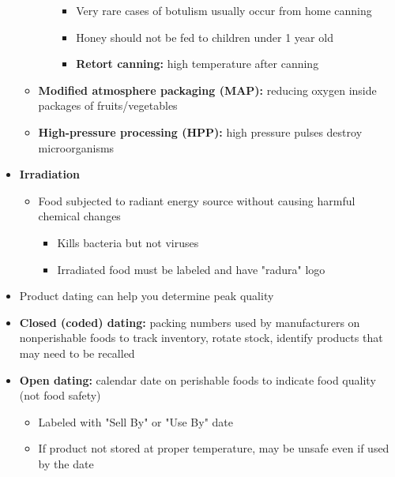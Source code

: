 \documentclass[12pt]{article}
\begin{document}
\begin{itemize}
\begin{itemize}
\begin{itemize}
\begin{itemize}
                                        \item Very rare cases of botulism usually occur from home canning
                                        \item Honey should not be fed to children under 1 year old
                                        \item \textbf{Retort canning:} high temperature after canning
                                    \end{itemize}
                            \end{itemize}
                        \item \textbf{Modified atmosphere packaging (MAP):} reducing oxygen inside packages of fruits/vegetables
                        \item \textbf{High-pressure processing (HPP):} high pressure pulses destroy microorganisms
                    \end{itemize}
                \item \textbf{Irradiation}
                    \begin{itemize}
                        \item Food subjected to radiant energy source without causing harmful chemical changes
                            \begin{itemize}
                                \item Kills bacteria but not viruses
                                \item Irradiated food must be labeled and have "radura" logo
                            \end{itemize}
                    \end{itemize}
                \item Product dating can help you determine peak quality
                \item \textbf{Closed (coded) dating:} packing numbers used by manufacturers on nonperishable foods to track inventory, rotate stock, identify products that may need to be recalled
                \item \textbf{Open dating:} calendar date on perishable foods to indicate food quality (not food safety)
                    \begin{itemize}
                        \item Labeled with "Sell By" or "Use By" date
                        \item If product not stored at proper temperature, may be unsafe even if used by the date
                    \end{itemize}
            \end{itemize}
\end{document}
